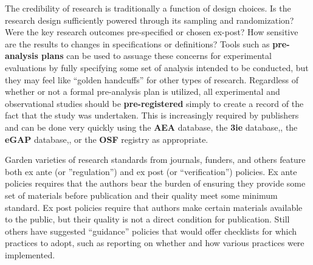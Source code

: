 The credibility of research is traditionally a function of design choices.\cite{angrist2010credibility,ioannidis2005most}
Is the research design sufficiently powered through its sampling and randomization?
Were the key research outcomes pre-specified or chosen ex-post?
How sensitive are the results to changes in specifications or definitions?
Tools such as \textbf{pre-analysis plans}
can be used to assuage these concerns for experimental evaluations
by fully specifying some set of analysis intended to be conducted,
but they may feel like ``golden handcuffs'' for other types of research.\cite{olken2015promises}
Regardless of whether or not a formal pre-analysis plan is utilized,
all experimental and observational studies should be \textbf{pre-registered}
simply to create a record of the fact that the study was undertaken.
This is increasingly required by publishers and can be done very quickly
using the \textbf{AEA} database,
the \textbf{3ie} database,,
the \textbf{eGAP} database,,
or the \textbf{OSF} registry as appropriate.

Garden varieties of research standards from journals, funders, and others feature both ex ante
(or ”regulation”) and ex post (or “verification”) policies.
Ex ante policies requires that the authors bear the burden
of ensuring they provide some set of materials before publication
and their quality meet some minimum standard.
Ex post policies require that authors make certain materials available to the public,
but their quality is not a direct condition for publication.
Still others have suggested “guidance” policies that would offer checklists
for which practices to adopt, such as reporting on whether and how
various practices were implemented.

